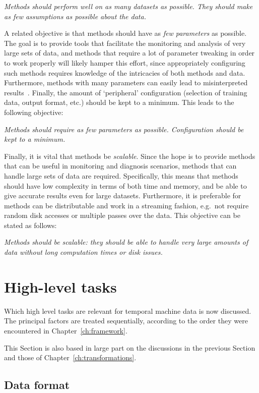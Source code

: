   \emph{Methods should perform well on as many datasets as possible. They should make as few assumptions as possible about the data.}

A related objective is that methods should have as \emph{few parameters} as possible. The goal is to provide tools that facilitate the monitoring and analysis of very large sets of data, and methods that require a lot of parameter tweaking in order to work properly will likely hamper this effort, since appropriately configuring such methods requires knowledge of the intricacies of both methods and data. Furthermore, methods with many parameters can easily lead to misinterpreted results~\cite{keogh2}. Finally, the amount of `peripheral' configuration (selection of training data, output format, etc.) should be kept to a minimum. This leads to the following objective:

  \emph{Methods should require as few parameters as possible. Configuration should be kept to a minimum.}

Finally, it is vital that methods be \emph{scalable}. Since the hope is to provide methods that can be useful in monitoring and diagnosis scenarios, methods that can handle large sets of data are required. Specifically, this means that methods should have low complexity in terms of both time and memory, and be able to give accurate results even for large datasets. Furthermore, it is preferable for methods can be distributable and work in a streaming fashion, e.g.\ not require random disk accesses or multiple passes over the data. This objective can be stated as follows:

  \emph{Methods should be scalable: they should be able to handle very large amounts of data without long computation times or disk issues.}

\section{High-level tasks}
\label{sect:relevant_tasks}

Which high level tasks are relevant for temporal machine data is now discussed. The principal factors are treated sequentially, according to the order they were encountered in Chapter~\ref{ch:framework}.

This Section is also based in large part on the discussions in the previous Section and those of Chapter~\ref{ch:transformations}. 

\subsection{Data format}
\label{sect:relevant_data_format}

